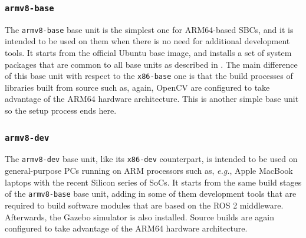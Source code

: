 \subsubsection{\texttt{armv8-base}}
\label{sec:dua_base_units_armv8-base}
The \texttt{armv8-base} base unit is the simplest one for ARM64-based SBCs, and it is intended to be used on them when there is no need for additional development tools. It starts from the official Ubuntu base image, and installs a set of system packages that are common to all base units as described in . The main difference of this base unit with respect to the \texttt{x86-base} one is that the build processes of libraries built from source such as, again, OpenCV are configured to take advantage of the ARM64 hardware architecture. This is another simple base unit so the setup process ends here.

\subsubsection{\texttt{armv8-dev}}
\label{sec:dua_base_units_armv8-dev}
The \texttt{armv8-dev} base unit, like its \texttt{x86-dev} counterpart, is intended to be used on general-purpose PCs running on ARM processors such as, \emph{e.g.}, Apple MacBook laptops with the recent Silicon series of SoCs. It starts from the same build stages of the \texttt{armv8-base} base unit, adding in some of them development tools that are required to build software modules that are based on the ROS 2 middleware. Afterwards, the Gazebo simulator is also installed. Source builds are again configured to take advantage of the ARM64 hardware architecture.

